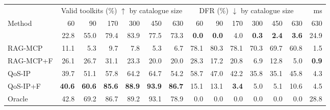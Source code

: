 \begin{tabular}{lrrrrrrrrrrrrr}\toprule
& \multicolumn{6}{c}{Valid toolkits (\%) $\uparrow$ by catalogue size} & \multicolumn{6}{c}{DFR (\%) $\downarrow$ by catalogue size} & ms \\ \cmidrule(lr){2-7}\cmidrule(lr){8-13}\cmidrule(lr){14-14}
Method & 60 & 90 & 170 & 300 & 450 & 630 & 60 & 90 & 170 & 300 & 450 & 630 & 630 \\ \midrule
\sysname{} & 22.8 & 55.0 & 79.4 & 83.9 & 77.5 & 73.3 & \textbf{0.0} & \textbf{0.0} & 4.0 & \textbf{0.3} & \textbf{2.4} & \textbf{3.6} & 24.9 \\
RAG-MCP & 11.1 & 5.3 & 9.7 & 7.8 & 5.3 & 6.7 & 78.1 & 80.3 & 78.1 & 70.3 & 69.7 & 60.8 & 1.5 \\
RAG-MCP+F & 26.1 & 26.7 & 31.1 & 23.3 & 20.0 & 20.0 & 28.3 & 17.2 & 20.8 & 6.9 & 12.8 & 5.0 & \textbf{0.9} \\
QoS-IP & 39.7 & 51.1 & 57.8 & 64.2 & 64.7 & 54.2 & 58.7 & 47.0 & 42.2 & 35.8 & 35.1 & 45.8 & 4.3 \\
QoS-IP+F & \textbf{40.6} & \textbf{60.6} & \textbf{85.6} & \textbf{88.9} & \textbf{93.9} & \textbf{86.7} & 15.1 & 13.1 & \textbf{3.4} & 5.0 & 5.1 & 10.6 & 4.5 \\
\midrule
Oracle & 42.8 & 69.2 & 86.7 & 89.2 & 93.1 & 78.9 & 0.0 & 0.0 & 0.0 & 0.0 & 0.0 & 0.0 & 28.8 \\
\bottomrule\end{tabular}
